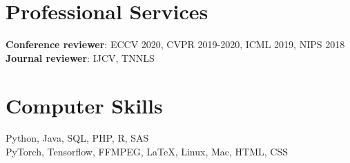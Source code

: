 \documentclass[10pt]{res} %
\begin{document}
\begin{resume}

\section{\large Professional Services}
\textbf{Conference reviewer}: ECCV 2020, CVPR 2019-2020, ICML 2019, NIPS 2018 \\
\textbf{Journal reviewer}: IJCV, TNNLS


\section{\large Computer Skills} 
Python, Java, SQL, PHP, R, SAS \\
PyTorch, Tensorflow, FFMPEG, \LaTeX, Linux, Mac, HTML, CSS


\end{resume}
\end{document}
